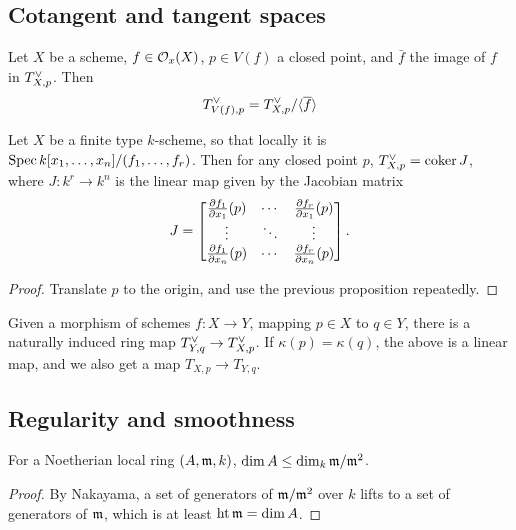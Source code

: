 \documentclass[11pt]{amsart}
\begin{document}
\subsection{Cotangent and tangent spaces}

\begin{prop}
    Let $X$ be a scheme, $f\in \mathcal{O}_x(X)$, $p \in V(f)$ a closed point, and $\bar{f}$ the image of $f$ in $T_{X,p}^{\vee}$. Then
    \[T_{V(f), p}^{\vee} = T_{X,p}^{\vee} / \langle\overline{f}\rangle\]
\end{prop}

\begin{prop}
    Let $X$ be a finite type $k$-scheme, so that locally it is $\operatorname{Spec} k[x_1,\dots,x_n]/(f_1,\dots,f_r)$. Then for any closed point $p$, $T_{X,p}^{\vee} = \operatorname{coker} J$, where $J: k^r\to k^n$ is the linear map given by the Jacobian matrix
    \[J = \begin{bmatrix}
        \frac{\partial f_1}{\partial x_1}(p) & \cdots & \frac{\partial f_r}{\partial x_1}(p) \\
        \vdots & \ddots & \vdots \\
        \frac{\partial f_1}{\partial x_n}(p) & \cdots & \frac{\partial f_r}{\partial x_n}(p)
    \end{bmatrix}.\]
\end{prop}

\begin{proof}
    Translate $p$ to the origin, and use the previous proposition repeatedly.
\end{proof}

Given a morphism of schemes $f:X\to Y$, mapping $p\in X$ to $q\in Y$, there is a naturally induced ring map $T_{Y,q}^{\vee} \to T_{X,p}^{\vee}$. If $\kappa(p) = \kappa(q)$, the above is a linear map, and we also get a map $T_{X,p} \to T_{Y,q}$.


\subsection{Regularity and smoothness}

\begin{prop}
    For a Noetherian local ring $(A,\mathfrak{m}, k)$, $\dim A \le \dim_k \mathfrak{m}/\mathfrak{m}^2$.
\end{prop}


\begin{proof}
    By Nakayama, a set of generators of $\mathfrak{m}/\mathfrak{m}^2$ over $k$ lifts to a set of generators of $\mathfrak{m}$, which is at least $\operatorname{ht} \mathfrak{m} = \dim A$.
\end{proof}
\end{document}
